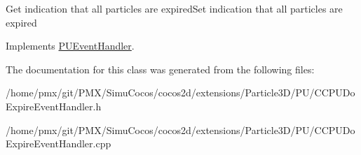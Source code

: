 Get indication that all particles are expired\+Set indication that all particles are expired 

Implements \hyperlink{classPUEventHandler_a760172609708c65548dcac364c9b3b9c}{P\+U\+Event\+Handler}.



The documentation for this class was generated from the following files\+:\begin{DoxyCompactItemize}
\item 
/home/pmx/git/\+P\+M\+X/\+Simu\+Cocos/cocos2d/extensions/\+Particle3\+D/\+P\+U/C\+C\+P\+U\+Do\+Expire\+Event\+Handler.\+h\item 
/home/pmx/git/\+P\+M\+X/\+Simu\+Cocos/cocos2d/extensions/\+Particle3\+D/\+P\+U/C\+C\+P\+U\+Do\+Expire\+Event\+Handler.\+cpp\end{DoxyCompactItemize}
